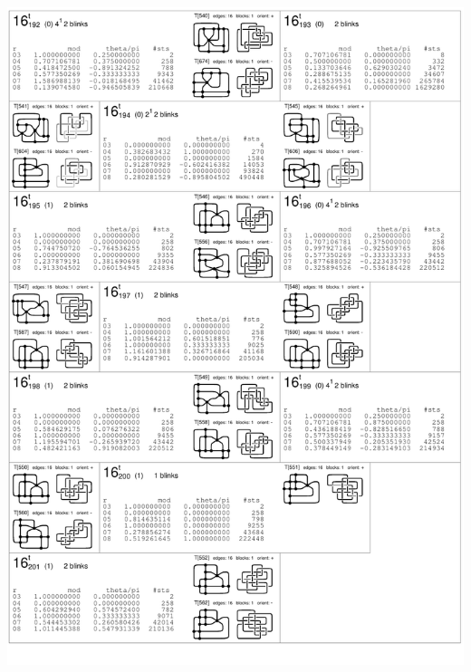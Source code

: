 \begin{center}
 \includegraphics[height=23.5cm]{E.figsbw2/con3catalog034_bw.pdf} \eject  

\end{center}
